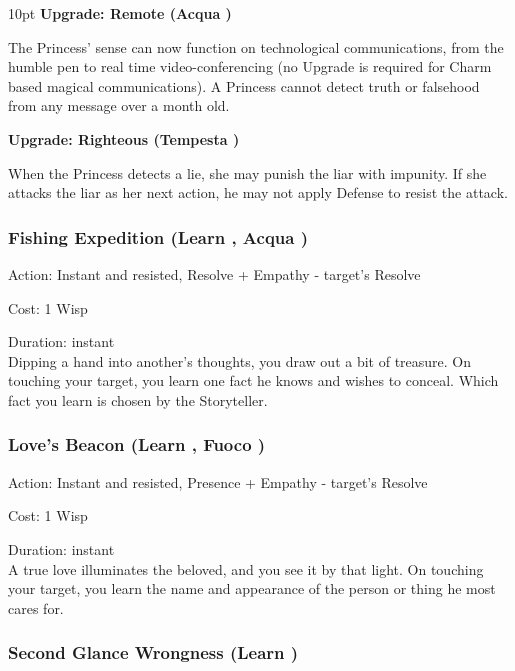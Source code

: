 \begin{myindentpar}{10pt}
\textbf{Upgrade: Remote (Acqua \textbullet)}

The Princess' sense can now function on technological communications, from the humble pen to real time video-conferencing (no Upgrade is required for Charm based magical communications). A Princess cannot detect truth or falsehood from any message over a month old. 

\textbf{Upgrade: Righteous (Tempesta \textbullet)}

When the Princess detects a lie, she may punish the liar with impunity. If she attacks the liar as her next action, he may not apply Defense to resist the attack.\end{myindentpar}

\subsubsection*{Fishing Expedition (Learn \textbullet, Acqua \textbullet)}

\noindent Action: Instant and resisted, Resolve + Empathy - target's Resolve

\noindent Cost: 1 Wisp

\noindent Duration: instant \\

\noindent  Dipping a hand into another's thoughts, you draw out a bit of treasure. On touching your target, you learn one fact he knows and wishes to conceal. Which fact you learn is chosen by the Storyteller.

\subsubsection*{Love's Beacon (Learn \textbullet, Fuoco \textbullet)}

\noindent Action: Instant and resisted, Presence + Empathy - target's Resolve

\noindent Cost: 1 Wisp

\noindent Duration: instant \\ 

\noindent  A true love illuminates the beloved, and you see it by that light. On touching your target, you learn the name and appearance of the person or thing he most cares for.

\subsubsection*{Second Glance Wrongness (Learn \textbullet\textbullet)}

